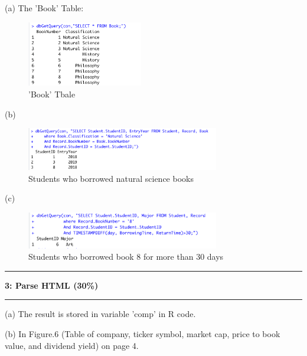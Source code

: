 \documentclass[11pt]{article}
\newcommand\question[2]{\vspace{.25in}\hrule\textbf{#1: #2}\vspace{.5em}\hrule\vspace{.10in}}
\begin{document}
(a) The 'Book' Table:
\begin{figure}[H]
    \centering
    \includegraphics[width=0.45\textwidth]{figures/Q2.1.png}
    \caption{'Book' Tbale}
\end{figure}
\newpage
(b) 
\begin{figure}[H]
    \centering
    \includegraphics[width=0.75\textwidth]{figures/Q2.2.png}
    \caption{Students who borrowed natural science books}
\end{figure}
(c)
\begin{figure}[H]
    \centering
    \includegraphics[width=0.75\textwidth]{figures/Q2.3.png}
    \caption{Students who borrowed book 8 for more than 30 days}
\end{figure}


\question{3}{Parse HTML (30\%)}
(a) The result is stored in variable 'comp' in R code.

(b) In Figure.6 (Table of company, ticker symbol, market cap, price to book value, and dividend yield) on page 4.
\end{document}
